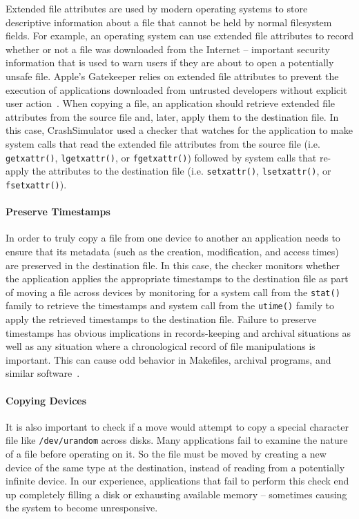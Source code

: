 Extended file attributes are used by modern
operating systems to store descriptive information about a file that cannot be
held by normal filesystem fields.  For example, an operating system can use
extended file attributes to record whether or not a file was downloaded from the
Internet -- important security information that is used to warn
users if they are about to open a potentially unsafe file.  Apple's Gatekeeper
relies on extended file attributes to prevent the execution of applications downloaded from
untrusted developers without explicit user action~\cite{AppleCodeSigning}.
When copying a file,
an application should retrieve extended file attributes from the source
file and, later, apply them to the destination file.
In this case, CrashSimulator used a checker
that watches for the application to make system calls
that read the extended file attributes from the source file (i.e. {\tt
  getxattr()}, {\tt lgetxattr()}, or {\tt fgetxattr()}) followed by system calls
that re-apply the attributes to the destination file (i.e. {\tt setxattr()},
{\tt lsetxattr()}, or {\tt fsetxattr()}).

\paragraph{Preserve Timestamps}

In order to truly copy a file from one device
to another an application needs to ensure that its metadata (such as the
creation, modification, and access times) are preserved in the destination
file.
In this case, the checker monitors
whether the application applies
the appropriate timestamps to the destination file as part of moving a file
across devices by monitoring for a system call from the {\tt stat()} family to
retrieve the timestamps and system call from the {\tt utime()} family to apply
the retrieved timestamps to the destination file.
Failure to preserve timestamps has obvious
implications in records-keeping and archival situations as well as any situation
where a chronological record of file manipulations is important.  This can
cause odd behavior in Makefiles, archival programs, and similar
software~\cite{NautilusTimestamps, SudoTimestamp}.

\paragraph{Copying Devices}

It is also important to check if a move would attempt to copy a special
character file like {\tt /dev/urandom} across disks.
Many applications fail to examine the nature of a file before
operating on it.  So the file must be moved by creating a new device of the same
type at the destination, instead of reading from a potentially infinite device.
In our experience, applications that fail to perform this check end up
completely filling a disk or exhausting available memory -- sometimes causing the
system to become unresponsive.


